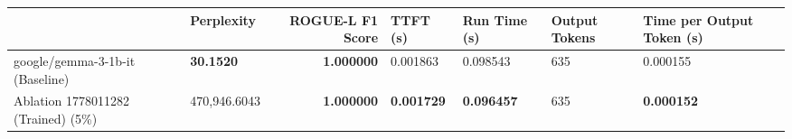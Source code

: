 \begin{table}[H]
\label{tab:evaluation-pipeline-9}
\begin{tabular}{llrllll}
\toprule
 & Perplexity & ROGUE-L F1 Score & TTFT (s) & Run Time (s) & Output Tokens & Time per Output Token (s) \\
\midrule
google/gemma-3-1b-it (Baseline) & \bfseries 30.1520 & \bfseries 1.000000 & 0.001863 & 0.098543 & 635 & 0.000155 \\
Ablation 1778011282 (Trained) (5\%) & \color{red} 470,946.6043 & \bfseries \color{red} 1.000000 & \bfseries \color{red} 0.001729 & \bfseries \color{red} 0.096457 & \color{red} 635 & \bfseries \color{red} 0.000152 \\
\bottomrule
\end{tabular}
\end{table}
